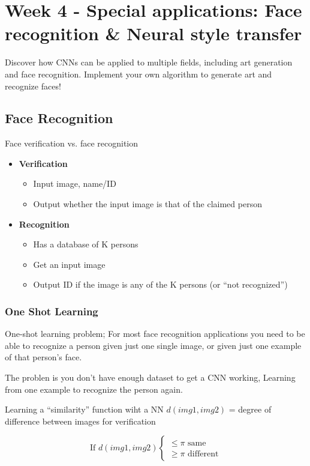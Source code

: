 \section{Week 4 - Special applications: Face recognition \& Neural style transfer}
Discover how CNNs can be applied to multiple fields, including art generation and face recognition. Implement your own algorithm to generate art and recognize faces!

\subsection{Face Recognition}
Face verification vs. face recognition
\begin{itemize}
    \item \textbf{Verification}
    \begin{itemize}
        \item Input image, name/ID
        \item Output whether the input image is that of the claimed person
    \end{itemize}
\end{itemize}
\begin{itemize}
    \item \textbf{Recognition}
    \begin{itemize}
        \item Has a database of K persons
        \item Get an input image
        \item Output ID if the image is any of the K persons (or “not recognized”)
    \end{itemize}
\end{itemize}

\subsubsection{One Shot Learning}
One-shot learning problem; For most face recognition applications you need to be able to recognize a person given just one single image, or given just one example of that person's face.

The problen is you don't have enough dataset to get a CNN working, Learning from one example to recognize the person again.

Learning a “similarity” function wiht a NN
$d(img1,img2)$ = degree of difference between images for verification

\begin{equation*}
    \text{If } d(img1,img2) \left\{
                \begin{array}{ll}
                  \leq \pi \text{ same} \\
                  \ge \pi \text{ different}
                \end{array}
              \right. 
\end{equation*}

